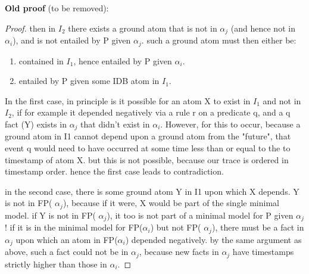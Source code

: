 \textbf{Old proof} (to be removed):
\begin{proof}
then in $I_2$ there exists a ground atom that is not in $\alpha_j$ 
(and hence not in $\alpha_i$), and is not entailed by P given $\alpha_j$.  
such a ground atom must then either be:

\begin{enumerate}
\item contained in $I_1$, hence entailed by P given $\alpha_i$.
\item entailed by P given some IDB atom in $I_1$.
\end{enumerate}

In the first case, in principle is it possible for an atom X to exist in $I_1$ and not in $I_2$, if for example it depended negatively via a 
rule r on a predicate q, and a q fact (Y) exists in  $\alpha_j$ that didn't exist in  $\alpha_i$.  However, for this to occur, because a ground atom 
in I1 cannot depend upon a ground atom from the "future", that event q would need to have occurred at some time less than 
or equal to the to timestamp of atom X.  but this is not possible, because our trace is ordered in timestamp order.  hence the 
first case leads to contradiction.

in the second case, there is some ground atom Y in I1 upon which X depends.  Y is not in FP( $\alpha_j$), because if it were, X would 
be part of the single minimal model.  if Y is not in FP( $\alpha_j$), it too is not part of a minimal model for P given  $\alpha_j$!  if it is in the minimal 
model for FP($\alpha_i$) but not FP( $\alpha_j$), there must be a fact in  $\alpha_j$ upon which an atom in FP($\alpha_i$) depended negatively.  by the same 
argument as above, such a fact could not be in  $\alpha_j$, because new facts in  $\alpha_j$ have timestamps strictly higher than those in  $\alpha_i$.
\end{proof}


